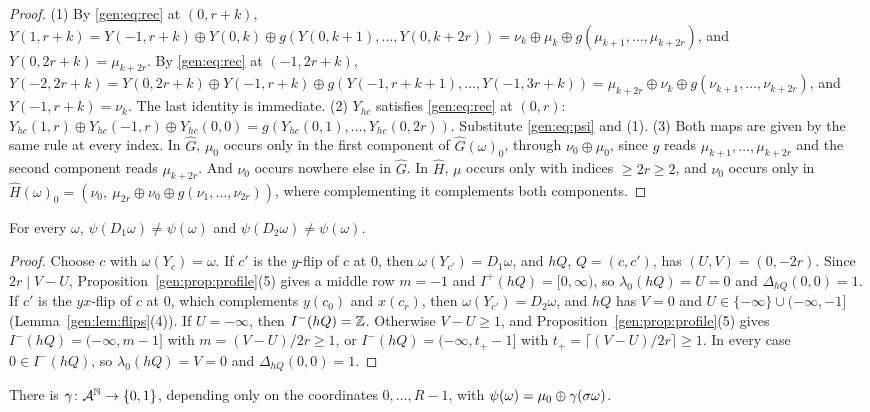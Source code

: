 \begin{proof}
(1) By \eqref{gen:eq:rec} at $(0,r+k)$, $Y(1,r+k)=Y(-1,r+k)\oplus Y(0,k)\oplus g(Y(0,k+1),\dots,Y(0,k+2r))=\nu_k\oplus\mu_k\oplus g(\mu_{k+1},\dots,\mu_{k+2r})$, and $Y(0,2r+k)=\mu_{k+2r}$. By \eqref{gen:eq:rec} at $(-1,2r+k)$, $Y(-2,2r+k)=Y(0,2r+k)\oplus Y(-1,r+k)\oplus g(Y(-1,r+k+1),\dots,Y(-1,3r+k))=\mu_{k+2r}\oplus\nu_k\oplus g(\nu_{k+1},\dots,\nu_{k+2r})$, and $Y(-1,r+k)=\nu_k$. The last identity is immediate.
(2) $Y_{hc}$ satisfies \eqref{gen:eq:rec} at $(0,r)$: $Y_{hc}(1,r)\oplus Y_{hc}(-1,r)\oplus Y_{hc}(0,0)=g(Y_{hc}(0,1),\dots,Y_{hc}(0,2r))$. Substitute \eqref{gen:eq:psi} and (1).
(3) Both maps are given by the same rule at every index. In $\hat G$, $\mu_0$ occurs only in the first component of $\hat G(\omega)_0$, through $\nu_0\oplus\mu_0$, since $g$ reads $\mu_{k+1},\dots,\mu_{k+2r}$ and the second component reads $\mu_{k+2r}$. And $\nu_0$ occurs nowhere else in $\hat G$. In $\hat H$, $\mu$ occurs only with indices $\ge2r\ge2$, and $\nu_0$ occurs only in $\hat H(\omega)_0=(\nu_0,\ \mu_{2r}\oplus\nu_0\oplus g(\nu_1,\dots,\nu_{2r}))$, where complementing it complements both components.
\end{proof}

\begin{proposition}\label{gen:prop:edges}
For every $\omega$, $\psi(D_1\omega)\ne\psi(\omega)$ and $\psi(D_2\omega)\ne\psi(\omega)$.
\end{proposition}

\begin{proof}
Choose $c$ with $\omega(Y_c)=\omega$. If $c'$ is the $y$-flip of $c$ at $0$, then $\omega(Y_{c'})=D_1\omega$, and $hQ$, $Q=(c,c')$, has $(U,V)=(0,-2r)$. Since $2r\mid V-U$, Proposition~\ref{gen:prop:profile}(5) gives a middle row $m=-1$ and $I^+(hQ)=[0,\infty)$, so $\lambda_0(hQ)=U=0$ and $\Delta_{hQ}(0,0)=1$. If $c'$ is the $yx$-flip of $c$ at $0$, which complements $y(c_0)$ and $x(c_r)$, then $\omega(Y_{c'})=D_2\omega$, and $hQ$ has $V=0$ and $U\in\{-\infty\}\cup(-\infty,-1]$ (Lemma~\ref{gen:lem:flips}(4)). If $U=-\infty$, then $I^-(hQ)=\mathbb{Z}$. Otherwise $V-U\ge1$, and Proposition~\ref{gen:prop:profile}(5) gives $I^-(hQ)=(-\infty,m-1]$ with $m=(V-U)/2r\ge1$, or $I^-(hQ)=(-\infty,t_+-1]$ with $t_+=\lceil(V-U)/2r\rceil\ge1$. In every case $0\in I^-(hQ)$, so $\lambda_0(hQ)=V=0$ and $\Delta_{hQ}(0,0)=1$.
\end{proof}

\begin{corollary}\label{gen:cor:psi}
There is $\gamma\colon\mathcal{A}^{\mathbb N}\to\{0,1\}$, depending only on the coordinates $0,\dots,R-1$, with $\psi(\omega)=\mu_0\oplus\gamma(\sigma\omega)$.
\end{corollary}

